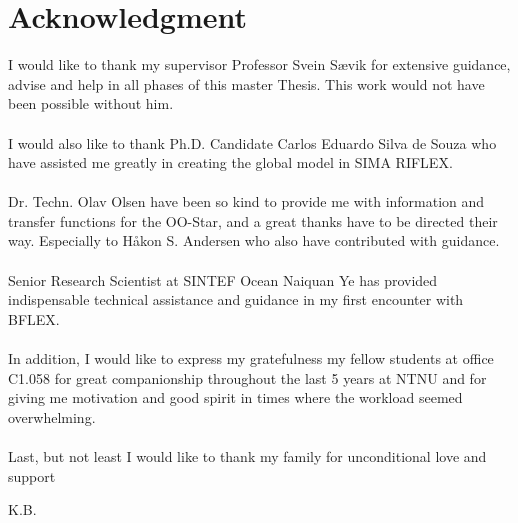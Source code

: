 \chapter*{Acknowledgment}
I would like to thank my supervisor Professor Svein Sævik for extensive guidance, advise and help in all phases of this master Thesis. This work would not have been possible without him. \\\\I would also like to thank Ph.D. Candidate Carlos Eduardo Silva de Souza who have assisted me greatly in creating the global model in SIMA RIFLEX. \\\\  Dr. Techn. Olav Olsen have been so kind to provide me with information and transfer functions for the OO-Star, and a great thanks have to be directed their way. Especially to Håkon S. Andersen who also have contributed with guidance. \\\\ Senior Research Scientist at SINTEF Ocean Naiquan Ye has provided indispensable technical assistance and guidance in my first encounter with BFLEX. \\\\ In addition, I would like to express my gratefulness my fellow students at office C1.058 for great companionship throughout the last 5 years at NTNU and for giving me motivation and good spirit in times where the workload seemed overwhelming. \\\\ Last, but not least I would like to thank my family for unconditional love and support


\newline
\newline
\newline

\begin{flushright}
K.B.
\end{flushright}

